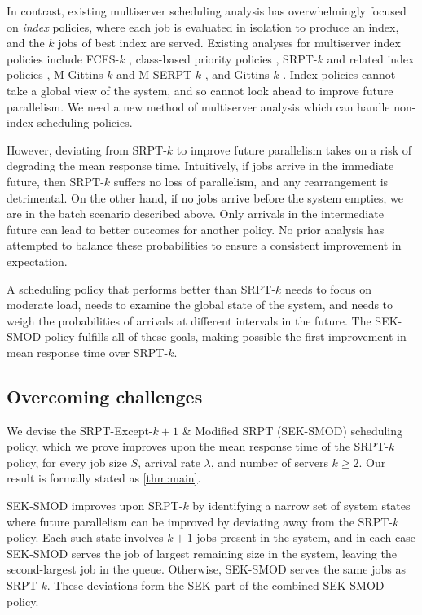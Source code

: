 \documentclass[acmsmall]{acmart}
\begin{document}
In contrast, existing multiserver scheduling analysis has overwhelmingly focused on \emph{index} policies, where each job is evaluated in isolation to produce an index, and the $k$ jobs of best index are served. Existing analyses for multiserver index policies include FCFS-$k$ \cite{loulou1973multi,kollerstrom1974heavy-1,kollerstrom1979heavy-ii,grosof-et-al2022wcfs}, class-based priority policies \cite{sleptchenko-et-al2005exact}, SRPT-$k$ and related index policies \cite{grosof-etal-2019-srpt-k}, M-Gittins-$k$ and M-SERPT-$k$ \cite{scully-et-al2021optimal}, and Gittins-$k$ \cite{scully-et-al2020gittins}.
Index policies cannot take a global view of the system,
and so cannot look ahead to improve future parallelism.
We need a new method of multiserver analysis which can handle non-index scheduling policies.

However, deviating from SRPT-$k$ to improve future parallelism takes on a risk of degrading the mean response time. Intuitively, if jobs arrive in the immediate future, then SRPT-$k$ suffers no loss of parallelism, and any rearrangement is detrimental.
On the other hand, if no jobs arrive before the system empties, we are in the batch scenario described above. 
Only arrivals in the intermediate future can lead to better outcomes for another policy.
No prior analysis has attempted to balance these probabilities
to ensure a consistent improvement in expectation.


A scheduling policy that performs better than SRPT-$k$ needs to focus on moderate load, needs to examine the global state of the system, and needs to weigh the probabilities of arrivals at different intervals in the future.
The SEK-SMOD policy fulfills all of these goals,
making possible the first improvement in mean response time over SRPT-$k$.


\subsection{Overcoming challenges}
\label{sec:overcome}

We devise the SRPT-Except-$k+1$ \& Modified SRPT (SEK-SMOD) scheduling policy, which we prove improves upon the mean response time of the SRPT-$k$ policy, for every job size $S$, arrival rate $\lambda$, and number of servers $k \ge 2$. Our result is formally stated as \cref{thm:main}.

SEK-SMOD improves upon SRPT-$k$ by identifying a narrow set of system states where future parallelism can be improved by deviating away from the SRPT-$k$ policy. Each such state involves $k+1$ jobs present in the system,
and in each case SEK-SMOD serves the job of largest remaining size in the system, leaving the second-largest job in the queue.
Otherwise, SEK-SMOD serves the same jobs as SRPT-$k$.
These deviations form the SEK part of the combined SEK-SMOD policy.
\end{document}

